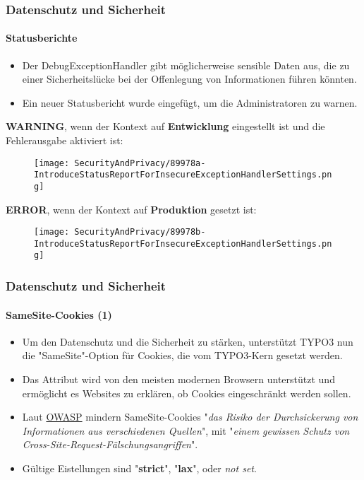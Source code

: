 \begin{frame}[fragile]
	\frametitle{Datenschutz und Sicherheit}
	\framesubtitle{Statusberichte}

	\begin{itemize}
		\item Der DebugExceptionHandler gibt möglicherweise sensible Daten aus, die
			zu einer Sicherheitslücke bei der Offenlegung von Informationen führen könnten.
		\item Ein neuer Statusbericht wurde eingefügt, um die Administratoren zu warnen.
	\end{itemize}

	\vspace{0.4cm}
	\textbf{WARNING}, wenn der Kontext auf \textbf{Entwicklung} eingestellt ist und die Fehlerausgabe aktiviert ist:
	\begin{figure}
		\texttt{[image: SecurityAndPrivacy/89978a-IntroduceStatusReportForInsecureExceptionHandlerSettings.png]}
	\end{figure}

	\textbf{ERROR}, wenn der Kontext auf \textbf{Produktion} gesetzt ist:
	\begin{figure}
		\texttt{[image: SecurityAndPrivacy/89978b-IntroduceStatusReportForInsecureExceptionHandlerSettings.png]}
	\end{figure}

\end{frame}


\begin{frame}[fragile]
	\frametitle{Datenschutz und Sicherheit}
	\framesubtitle{SameSite-Cookies (1)}

	\begin{itemize}
		\item Um den Datenschutz und die Sicherheit zu stärken, unterstützt TYPO3 nun die "SameSite"-Option
			für Cookies, die vom TYPO3-Kern gesetzt werden.
		\item Das Attribut wird von den meisten modernen Browsern unterstützt und ermöglicht es Websites
			zu erklären, ob Cookies eingeschränkt werden sollen.
		\item Laut
			\href{https://www.owasp.org/index.php/SameSite}{OWASP} mindern SameSite-Cookies\newline
			\small
				"\textit{das Risiko der Durchsickerung von Informationen aus verschiedenen Quellen}", mit\newline
				"\textit{einem gewissen Schutz von Cross-Site-Request-Fälschungsangriffen}".
			\normalsize

		\item Gültige Eistellungen sind "\textbf{strict}", "\textbf{lax}", oder \textit{not set}.
	\end{itemize}

\end{frame}

